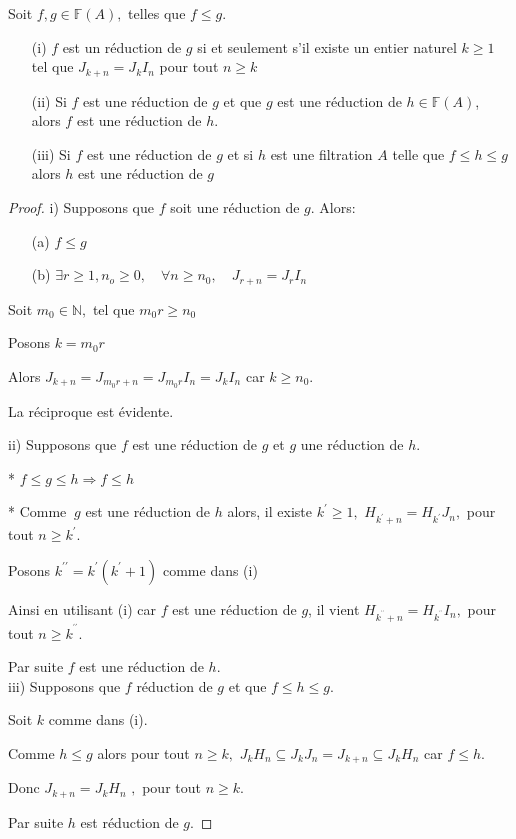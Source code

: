 \begin{maproposition}
	Soit $f,g \in \mathbb{F}(A),$ telles que $f \leqslant g$.
	\begin{enumerate}
		\item[(i)] $f$ est un réduction de $g$ si et seulement s'il existe un entier naturel $k \geqslant 1$ tel que $J_{k+n}  = J_{k}I_n$ pour tout $n \geqslant k$
		\item[(ii)] Si $f$ est une réduction de $g$ et que $g$ est une réduction de $h \in \mathbb{F}(A)$, alors $f$ est une réduction de $h$. 
		\item[(iii)] Si $f$ est une réduction de $g$ et si $h$ est une filtration $A$ telle que $f \leqslant h \leqslant g$ alors $h$ est une réduction de $g$
	\end{enumerate}
\end{maproposition}
\begin{proof}
	i) Supposons que $f$ soit une réduction de $g$. Alors:
	\begin{enumerate}
		\item[(a)] $f \leqslant g$
		\item[(b)] $\exists r \geqslant 1,n_o \geqslant 0 ,\quad \forall n \geqslant n_0,\quad J_{r+n}= J_r I_n $
	\end{enumerate}
	Soit $m_{0}\in \mathbb{N},$ tel que $m_{0}r\geq n_{0}$
	
	Posons $k=m_{0}r$
	
	Alors $J_{k+n}=J_{m_{0}r+n}=J_{m_{0}r}I_{n}=J_{k}I_{n}$ car $k\geq n_{0}.$
	
	La réciproque est évidente.
	
	ii) Supposons que $f$ est une réduction de $g$ et $g$ une réduction
	de $h.$
	
	* $f\leq g\leq h\Rightarrow f\leq h$
	
	* Comme $\ g$ est une réduction de $h$ alors, il existe $k^{\prime }\geq
	1,$ $H_{k^{\prime }+n}=H_{k^{\prime }}J_{n},$ pour tout $n\geq k^{\prime }.$
	
	Posons $k^{\prime \prime }=k^{\prime }(k^{\prime }+1)$ comme dans (i)
	
	Ainsi en utilisant (i) car $f$ est une réduction de $g$, il vient  $H_{k^{^{\prime \prime }}+n}=H_{k^{^{\prime \prime }}}I_{n},$ pour tout $n\geq k^{^{\prime \prime }}.$
	
	Par suite $f$ est une réduction de $h$. \\
	
	iii) Supposons que $f$ réduction de $g$ et que $f\leq h\leq g.$
	
	Soit $k$ comme dans (i).
	
	Comme $h\leq g$ alors pour tout $n\geq k,$ $J_{k}H_{n}\subseteq
	J_{k}J_{n}=J_{k+n}\subseteq J_{k}H_{n}$ car $f\leq h.$
	
	Donc $J_{k+n}=J_{k}H_{n}$ $,$ pour tout $n\geq k.$
	
	Par suite $h$ est réduction de $g.$
\end{proof}


